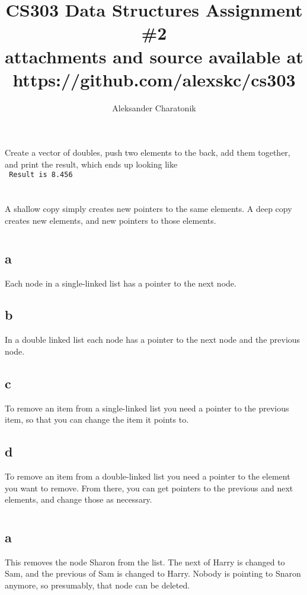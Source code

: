 \documentclass[12pt]{article}
\title{CS303 Data Structures Assignment \#2\\
\large attachments and source available at https://github.com/alexskc/cs303}
\author{Aleksander Charatonik}
\begin{document}
\maketitle

\section{}
Create a vector of doubles, push two elements to the back, add them together, and print the result, which ends up looking like\\
\texttt{
  Result is 8.456
}
\section{}
A shallow copy simply creates new pointers to the same elements. A deep copy creates new elements, and new pointers to those elements.
\section{}
\subsection*{a}
Each node in a single-linked list has a pointer to the next node.
\subsection*{b}
In a double linked list each node has a pointer to the next node and the previous node.
\subsection*{c}
To remove an item from a single-linked list you need a pointer to the previous item, so that you can change the item it points to.
\subsection*{d}
To remove an item from a double-linked list you need a pointer to the element you want to remove. From there, you can get pointers to the previous and next elements, and change those as necessary.
\section{}
\subsection*{a}
This removes the node Sharon from the list. The next of Harry is changed to Sam, and the previous of Sam is changed to Harry. Nobody is pointing to Snaron anymore, so presumably, that node can be deleted.
\end{document}
